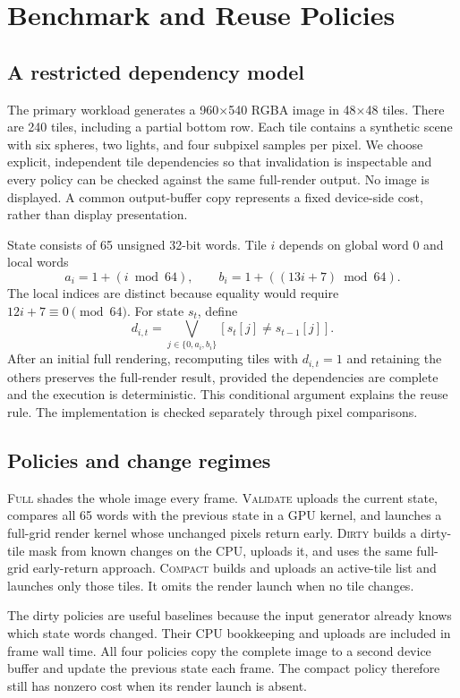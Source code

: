 \documentclass[10pt,conference]{IEEEtran}
\newcommand{\Full}{\textsc{Full}}
\newcommand{\Validate}{\textsc{Validate}}
\newcommand{\Dirty}{\textsc{Dirty}}
\newcommand{\Compact}{\textsc{Compact}}
\begin{document}
\section{Benchmark and Reuse Policies}
\subsection{A restricted dependency model}
The primary workload generates a 960$\times$540 RGBA image in 48$\times$48 tiles. There are 240 tiles, including a partial bottom row. Each tile contains a synthetic scene with six spheres, two lights, and four subpixel samples per pixel. We choose explicit, independent tile dependencies so that invalidation is inspectable and every policy can be checked against the same full-render output. No image is displayed. A common output-buffer copy represents a fixed device-side cost, rather than display presentation.

State consists of 65 unsigned 32-bit words. Tile $i$ depends on global word 0 and local words
\begin{equation}
a_i=1+(i\bmod64),\qquad b_i=1+((13i+7)\bmod64).
\end{equation}
The local indices are distinct because equality would require $12i+7\equiv0\pmod{64}$. For state $s_t$, define
\begin{equation}
d_{i,t}=\bigvee_{j\in\{0,a_i,b_i\}}[s_t[j]\ne s_{t-1}[j]].
\end{equation}
After an initial full rendering, recomputing tiles with $d_{i,t}=1$ and retaining the others preserves the full-render result, provided the dependencies are complete and the execution is deterministic. This conditional argument explains the reuse rule. The implementation is checked separately through pixel comparisons.

\subsection{Policies and change regimes}
\Full{} shades the whole image every frame. \Validate{} uploads the current state, compares all 65 words with the previous state in a GPU kernel, and launches a full-grid render kernel whose unchanged pixels return early. \Dirty{} builds a dirty-tile mask from known changes on the CPU, uploads it, and uses the same full-grid early-return approach. \Compact{} builds and uploads an active-tile list and launches only those tiles. It omits the render launch when no tile changes.

The dirty policies are useful baselines because the input generator already knows which state words changed. Their CPU bookkeeping and uploads are included in frame wall time. All four policies copy the complete image to a second device buffer and update the previous state each frame. The compact policy therefore still has nonzero cost when its render launch is absent.
\end{document}

